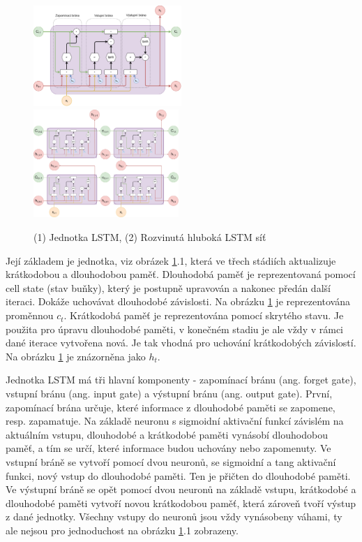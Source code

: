 \begin{figure}[]
    \centering
    \includegraphics[width=0.5\textwidth]{Figures/LSTM_unit.pdf}
    \includegraphics[width=0.49\textwidth]{Figures/LSTM_deep.pdf}
    \caption{(1) Jednotka LSTM, (2) Rozvinutá hluboká LSTM síť}
    \label{fig:lstm_unit}
\end{figure}

Její základem je jednotka, viz obrázek \ref{fig:lstm_unit}.1, která ve třech
stádiích aktualizuje krátkodobou a dlouhodobou paměť. Dlouhodobá paměť je
reprezentovaná pomocí cell state (stav buňky), který je postupně upravován a
nakonec předán další iteraci. Dokáže uchovávat dlouhodobé závislosti. Na
obrázku \ref{fig:lstm_unit} je reprezentována proměnnou $c_t$. Krátkodobá paměť
je reprezentována pomocí skrytého stavu. Je použita pro úpravu dlouhodobé
paměti, v konečném stadiu je ale vždy v rámci dané iterace vytvořena nová. Je
tak vhodná pro uchování krátkodobých závislostí. Na obrázku \ref{fig:lstm_unit}
je znázorněna jako $h_t$.

Jednotka LSTM má tři hlavní komponenty - zapomínací bránu (ang. forget gate),
vstupní bránu (ang. input gate) a výstupní bránu (ang. output gate). První,
zapomínací brána určuje, které informace z dlouhodobé paměti se zapomene, resp.
zapamatuje. Na základě neuronu s sigmoidní aktivační funkcí závislém na
aktuálním vstupu, dlouhodobé a krátkodobé paměti vynásobí dlouhodobou paměť, a
tím se určí, které informace budou uchovány nebo zapomenuty. Ve vstupní bráně
se vytvoří pomocí dvou neuronů, se sigmoidní a tang aktivační funkci, nový
vstup do dlouhodobé paměti. Ten je přičten do dlouhodobé paměti. Ve výstupní
bráně se opět pomocí dvou neuronů na základě vstupu, krátkodobé a dlouhodobé
paměti vytvoří novou krátkodobou paměť, která zároveň tvoří výstup z dané
jednotky. Všechny vstupy do neuronů jsou vždy vynásobeny váhami, ty ale nejsou
pro jednoduchost na obrázku \ref{fig:lstm_unit}.1 zobrazeny.

